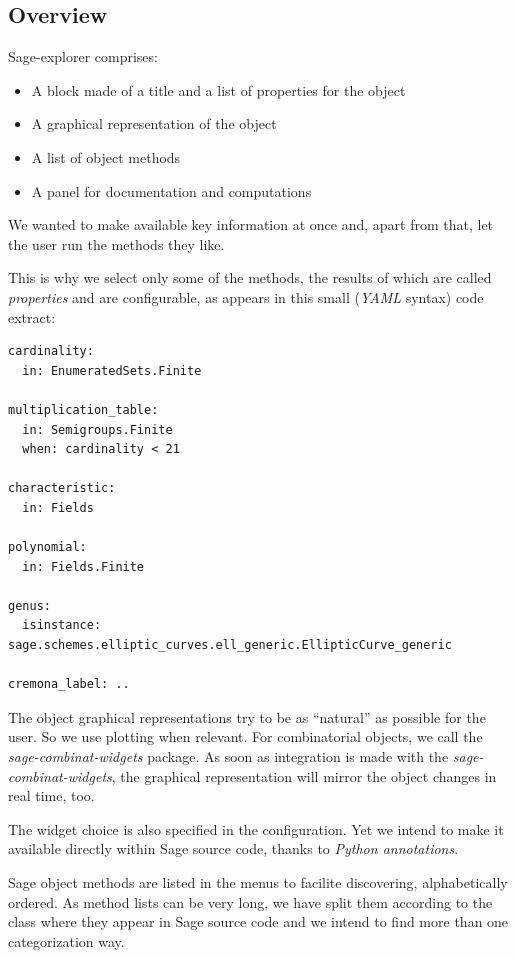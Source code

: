 \documentclass{deliverablereport}
\begin{document}

\subsection{Overview}

Sage-explorer comprises:

\begin{itemize}
  \item A block made of a title and a list of properties for the object
  \item A graphical representation of the object
  \item A list of object methods
  \item A panel for documentation and computations
\end{itemize}

We wanted to make available key information at once and, apart from
that, let the user run the methods they like.

This is why we select only some of the methods, the results of which
are called \emph{properties} and are configurable, as appears in this
small (\emph{YAML} syntax) code extract:

\begin{lstlisting}
cardinality:
  in: EnumeratedSets.Finite

multiplication_table:
  in: Semigroups.Finite
  when: cardinality < 21

characteristic:
  in: Fields

polynomial:
  in: Fields.Finite

genus:
  isinstance: sage.schemes.elliptic_curves.ell_generic.EllipticCurve_generic

cremona_label: ..
\end{lstlisting}

The object graphical representations try to be as ``natural'' as
possible for the user. So we use plotting when relevant. For
combinatorial objects, we call the \emph{sage-combinat-widgets}
package. As soon as integration is made with the \emph{sage-combinat-widgets},
the graphical representation will mirror the object changes in real
time, too.

The widget choice is also specified in the configuration. Yet we
intend to make it available directly within Sage source code, thanks
to \emph{Python annotations}.

Sage object methods are listed in the menus to facilite
discovering, alphabetically ordered. As method lists can be very long,
we have split them according to the class where they appear in Sage source
code and we intend to find more than one categorization way.
\end{document}
